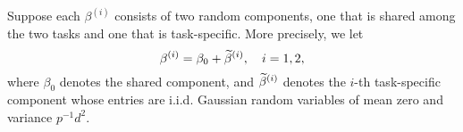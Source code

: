 	Suppose each $\beta^{(i)}$ consists of two random components, one that is shared among the two tasks and one that is task-specific. More precisely, we let
$$\beta^{(i)}=\beta_0 +\widetilde \beta^{(i)},\quad i=1,2, $$
where $\beta_0$ denotes the shared component, %
and $\widetilde \beta^{(i)}$ denotes the $i$-th
task-specific component whose entries are i.i.d. Gaussian random variables of mean zero and variance $p^{-1} d^2$.

